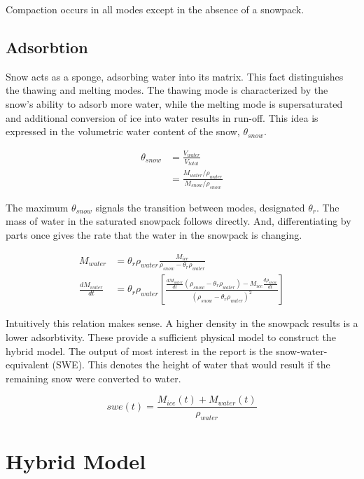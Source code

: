 \documentclass{article}
\begin{document}
Compaction occurs in all modes except in the
absence of a snowpack.


\subsection{Adsorbtion}

Snow acts as a sponge, adsorbing water into its matrix.
This fact distinguishes the thawing and melting modes.
The thawing mode is characterized by the snow's ability
to adsorb more water, while the melting mode is supersaturated
and additional conversion of ice into water results in run-off.
This idea is expressed in the volumetric water content of the snow,
$\theta_{snow}$.

\begin{align}
\theta_{snow} &= \frac{V_{water}}{V_{total}} \\
   &= \frac{M_{water}/ \rho_{water}}{M_{snow}/\rho_{snow}}
\end{align}

The maximum $\theta_{snow}$ signals the transition between
modes, designated $\theta_{r}$.
The mass of water in the saturated snowpack follows directly.
And, differentiating by parts once gives the rate that the water in the
snowpack is changing.

\begin{align}
M_{water}  &= \theta_{r} \rho_{water}
      \frac{M_{ice}}{\rho_{snow} - \theta_{r} \rho_{water}} \\
\frac{d M_{water}}{dt} &=  \theta_{r} \rho_{water}
   \left[ \frac{\frac{d M_{water}}{dt} (\rho_{snow} - \theta_{r} \rho_{water})
                  - M_{ice} \frac{d \rho_{snow}}{dt} }
          {(\rho_{snow} - \theta_{r} \rho_{water})^2} \right]
          \label{eqn:saturation}
\end{align}

Intuitively this relation makes sense.
A higher density in the snowpack results is a lower adsorbtivity.
These provide a sufficient physical model to construct the hybrid model.
The output of most interest in the report is the snow-water-equivalent (SWE).
This denotes the height of water that would result if the remaining
snow were converted to water.

\begin{equation}
swe(t) = \frac{M_{ice}(t) + M_{water}(t)}{\rho_{water}} \label{eqn:swe}
\end{equation}


\section{Hybrid Model}
\end{document}
